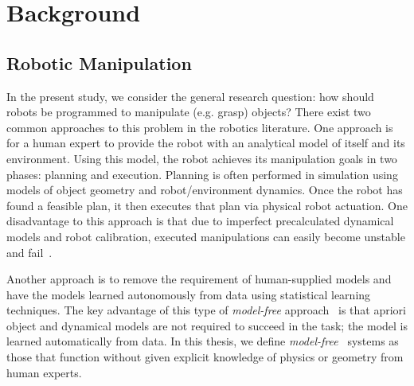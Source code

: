 \chapter{Background}
\label{chap2}

\section{Robotic Manipulation}

In the present study, we consider the general research question: how should robots be programmed to manipulate (e.g. grasp) objects? 
There exist two common approaches to this problem in the robotics literature.
One approach is for a human expert to provide the robot with an analytical model of itself and its environment. 
Using this model, the robot achieves its manipulation goals in two phases: planning and execution.
Planning is often performed in simulation using models of object geometry and robot/environment dynamics.
Once the robot has found a feasible plan, it then executes that plan via physical robot actuation.
One disadvantage to this approach is that due to imperfect precalculated dynamical models and robot calibration, executed manipulations can easily become unstable and fail~\cite{dang2012tactile}.

Another approach is to remove the requirement of human-supplied models and have the models learned autonomously from data using statistical learning techniques.
The key advantage of this type of \emph{model-free} approach~\cite{Spall1998,hornung2014anomaly} is that apriori object and dynamical models are not required to succeed in the task; the model is learned automatically from data.
In this thesis, we define \emph{model-free}~\cite{Spall1998} systems as those that function without given explicit knowledge of physics or geometry from human experts.




